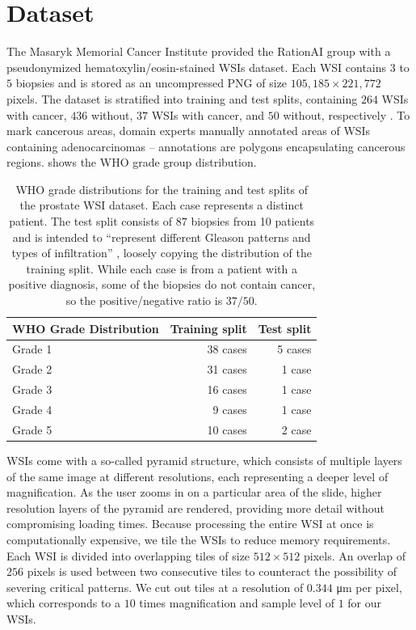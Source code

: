 \section{Dataset}\label{sec:dataset}

The Masaryk Memorial Cancer Institute provided the RationAI group with a pseudonymized hematoxylin/eosin-stained WSIs dataset.
Each WSI contains $3$ to $5$ biopsies and is stored as an uncompressed PNG of size $105,185 \times 221,772$ pixels.
The dataset is stratified into training and test splits, containing $264$ WSIs with cancer, $436$ without, $37$ WSIs with cancer, and $50$ without, respectively \cite{gallo}.
To mark cancerous areas, domain experts manually annotated areas of WSIs containing adenocarcinomas -- annotations are polygons encapsulating cancerous regions.
 shows the WHO grade group distribution.

\begin{table}
\centering
{}
\begin{tabular}{@{} l r r @{}}\toprule
WHO Grade Distribution & Training split & Test split \\ 
\midrule
Grade 1         & 38 cases            & 5 cases      \\
Grade 2         & 31 cases            & 1 case       \\
Grade 3         & 16 cases            & 1 case       \\
Grade 4         & 9 cases             & 1 case       \\
Grade 5         & 10 cases            & 2 case       \\
\bottomrule
\end{tabular}
\caption{WHO grade distributions for the training and test splits of the prostate WSI dataset. Each case represents a distinct patient. The test split consists of $87$ biopsies from 10 patients and is intended to ``represent different Gleason patterns
and types of infiltration'' \cite{gallo}, loosely copying the distribution of the training split. While each case is from a patient with a positive diagnosis, some of the biopsies do not contain cancer, so the positive/negative ratio is $37/50$.}
\label{tab:who_grade_distribution}
\end{table}

WSIs come with a so-called pyramid structure, which consists of multiple layers of the same image at different resolutions, each representing a deeper level of magnification.
As the user zooms in on a particular area of the slide, higher resolution layers of the pyramid are rendered, providing more detail without compromising loading times.
Because processing the entire WSI at once is computationally expensive, we tile the WSIs to reduce memory requirements.
Each WSI is divided into overlapping tiles of size $512 \times 512$ pixels.
An overlap of $256$ pixels is used between two consecutive tiles to counteract the possibility of severing critical patterns.
We cut out tiles at a resolution of $0.344$ \si{\micro\meter} per pixel, which corresponds to a $10$ times magnification and sample level of $1$ for our WSIs.

